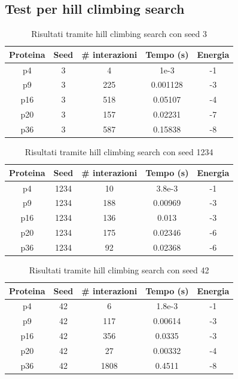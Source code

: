 \documentclass[conference]{IEEEtran}
\begin{document}
\subsection{Test per hill climbing search}

\begin{table}[H]
\begin{center}
\begin{tabular}{|c|c|c|c|c|}
\hline
\textbf{Proteina} & \textbf{Seed} & \textbf{\# interazioni} & \textbf{Tempo (s)} & \textbf{Energia} \\ \hline
p4 & 3 & 4 & 1e-3 & -1 \\ \hline
p9 & 3 & 225 & 0.001128 & -3 \\ \hline
p16 & 3 & 518 & 0.05107 & -4 \\ \hline
p20 & 3 & 157 & 0.02231 & -7 \\ \hline
p36 & 3 & 587 & 0.15838 & -8 \\ \hline
\end{tabular}
\end{center}
\caption{Risultati tramite hill climbing search con seed 3}
\end{table}

\begin{table}[H]
\begin{center}
\begin{tabular}{|c|c|c|c|c|}
\hline
\textbf{Proteina} & \textbf{Seed} & \textbf{\# interazioni} & \textbf{Tempo (s)} & \textbf{Energia} \\ \hline
p4 & 1234 & 10 & 3.8e-3 & -1 \\ \hline
p9 & 1234 & 188 & 0.00969 & -3 \\ \hline
p16 & 1234 & 136 & 0.013 & -3 \\ \hline
p20 & 1234 & 175 & 0.02346 & -6 \\ \hline
p36 & 1234 & 92 & 0.02368 & -6 \\ \hline
\end{tabular}
\end{center}
\caption{Risultati tramite hill climbing search con seed 1234}
\end{table}

\begin{table}[H]
\begin{center}
\begin{tabular}{|c|c|c|c|c|}
\hline
\textbf{Proteina} & \textbf{Seed} & \textbf{\# interazioni} & \textbf{Tempo (s)} & \textbf{Energia} \\ \hline
p4 & 42 & 6 & 1.8e-3 & -1 \\ \hline
p9 & 42 & 117 & 0.00614 & -3 \\ \hline
p16 & 42 & 356 & 0.0335 & -3 \\ \hline
p20 & 42 & 27 & 0.00332 & -4 \\ \hline
p36 & 42 & 1808 & 0.4511 & -8 \\ \hline
\end{tabular}
\end{center}
\caption{Risultati tramite hill climbing search con seed 42}
\end{table}
\end{document}
